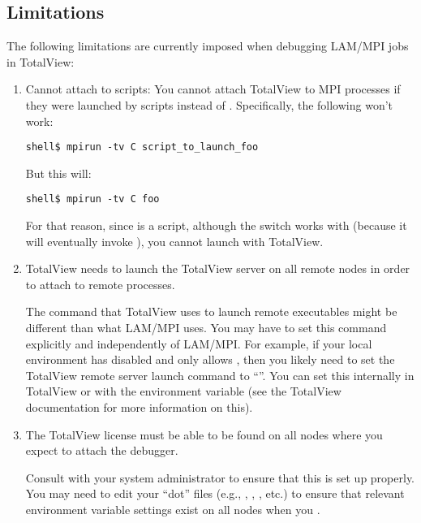 
\subsection{Limitations}

The following limitations are currently imposed when debugging LAM/MPI
jobs in TotalView:

\begin{enumerate}
\item Cannot attach to scripts: You cannot attach TotalView to MPI
  processes if they were launched by scripts instead of .
  Specifically, the following won't work:
                
  \lstset{style=lam-cmdline}
  \begin{lstlisting}
shell$ mpirun -tv C script_to_launch_foo
  \end{lstlisting}

  But this will:

  \lstset{style=lam-cmdline}
  \begin{lstlisting}
shell$ mpirun -tv C foo
  \end{lstlisting}
  
  For that reason, since  is a script, although the
   switch works with  (because it will
  eventually invoke ), you cannot launch 
  with TotalView.
  
\item TotalView needs to launch the TotalView server on all remote
  nodes in order to attach to remote processes.  
  
  The command that TotalView uses to launch remote executables might
  be different than what LAM/MPI uses.  You may have to set this
  command explicitly and independently of LAM/MPI.
%
  For example, if your local environment has  disabled and
  only allows , then you likely need to set the TotalView
  remote server launch command to ``''.  You can set this
  internally in TotalView or with the 
  environment variable (see the TotalView documentation for more
  information on this).
  
\item The TotalView license must be able to be found on all nodes
  where you expect to attach the debugger.  
  
  Consult with your system administrator to ensure that this is set up
  properly.  You may need to edit your ``dot'' files (e.g.,
  , , , etc.) to ensure that
  relevant environment variable settings exist on all nodes when you
  .
  

\end{enumerate}
